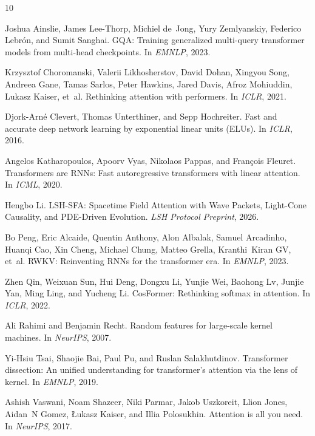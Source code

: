 \documentclass{article}
\begin{document}

\begin{thebibliography}{10}

Joshua Ainslie, James Lee-Thorp, Michiel de~Jong, Yury Zemlyanskiy, Federico Lebr\'{o}n, and Sumit Sanghai.
\newblock GQA: Training generalized multi-query transformer models from multi-head checkpoints.
\newblock In \emph{EMNLP}, 2023.

Krzysztof Choromanski, Valerii Likhosherstov, David Dohan, Xingyou Song, Andreea Gane, Tamas Sarlos, Peter Hawkins, Jared Davis, Afroz Mohiuddin, Lukasz Kaiser, et~al.
\newblock Rethinking attention with performers.
\newblock In \emph{ICLR}, 2021.

Djork-Arn\'{e} Clevert, Thomas Unterthiner, and Sepp Hochreiter.
\newblock Fast and accurate deep network learning by exponential linear units (ELUs).
\newblock In \emph{ICLR}, 2016.

Angelos Katharopoulos, Apoorv Vyas, Nikolaos Pappas, and Fran\c{c}ois Fleuret.
\newblock Transformers are RNNs: Fast autoregressive transformers with linear attention.
\newblock In \emph{ICML}, 2020.

Hengbo Li.
\newblock LSH-SFA: Spacetime Field Attention with Wave Packets, Light-Cone Causality, and PDE-Driven Evolution.
\newblock \emph{LSH Protocol Preprint}, 2026.

Bo Peng, Eric Alcaide, Quentin Anthony, Alon Albalak, Samuel Arcadinho, Huanqi Cao, Xin Cheng, Michael Chung, Matteo Grella, Kranthi~Kiran GV, et~al.
\newblock RWKV: Reinventing RNNs for the transformer era.
\newblock In \emph{EMNLP}, 2023.

Zhen Qin, Weixuan Sun, Hui Deng, Dongxu Li, Yunjie Wei, Baohong Lv, Junjie Yan, Ming Ling, and Yucheng Li.
\newblock CosFormer: Rethinking softmax in attention.
\newblock In \emph{ICLR}, 2022.

Ali Rahimi and Benjamin Recht.
\newblock Random features for large-scale kernel machines.
\newblock In \emph{NeurIPS}, 2007.

Yi-Hsiu Tsai, Shaojie Bai, Paul Pu, and Ruslan Salakhutdinov.
\newblock Transformer dissection: An unified understanding for transformer's attention via the lens of kernel.
\newblock In \emph{EMNLP}, 2019.

Ashish Vaswani, Noam Shazeer, Niki Parmar, Jakob Uszkoreit, Llion Jones, Aidan~N Gomez, {\L}ukasz Kaiser, and Illia Polosukhin.
\newblock Attention is all you need.
\newblock In \emph{NeurIPS}, 2017.

\end{thebibliography}
\end{document}
